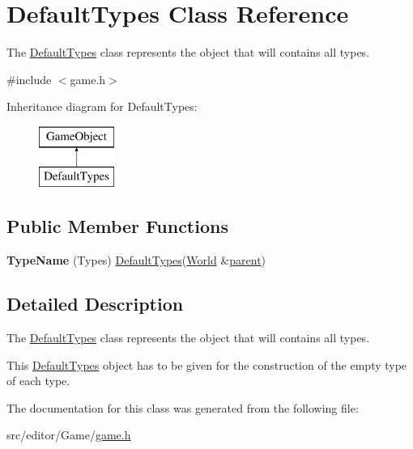 \hypertarget{class_default_types}{\section{\-Default\-Types \-Class \-Reference}
\label{class_default_types}
}


\-The \hyperlink{class_default_types}{\-Default\-Types} class represents the object that will contains all types.  




{\ttfamily \#include $<$game.\-h$>$}

\-Inheritance diagram for \-Default\-Types\-:\begin{figure}[H]
\begin{center}
\leavevmode
\includegraphics[height=2.000000cm]{class_default_types}
\end{center}
\end{figure}
\subsection*{\-Public \-Member \-Functions}
\begin{DoxyCompactItemize}
\item 
\hypertarget{class_default_types_ae84d7b88557a4858e024a4ac159c4029}{{\bfseries \-Type\-Name} (\-Types) \hyperlink{class_default_types}{\-Default\-Types}(\hyperlink{class_world}{\-World} \&\hyperlink{class_game_object_af3deaf39cde23c189765634e32e95bb4}{parent})}\label{class_default_types_ae84d7b88557a4858e024a4ac159c4029}

\end{DoxyCompactItemize}


\subsection{\-Detailed \-Description}
\-The \hyperlink{class_default_types}{\-Default\-Types} class represents the object that will contains all types. 

\-This \hyperlink{class_default_types}{\-Default\-Types} object has to be given for the construction of the empty type of each type. 

\-The documentation for this class was generated from the following file\-:\begin{DoxyCompactItemize}
\item 
src/editor/\-Game/\hyperlink{game_8h}{game.\-h}\end{DoxyCompactItemize}
